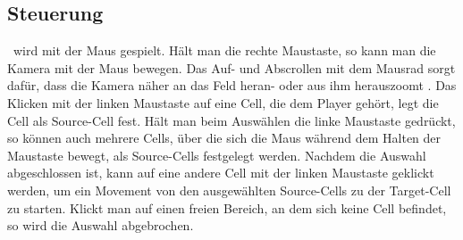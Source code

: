 \subsection{Steuerung}
\vires\ wird mit der Maus gespielt. Hält man die rechte Maustaste, so kann man die Kamera mit der Maus bewegen. Das Auf- und Abscrollen mit dem Mausrad sorgt dafür, dass die Kamera näher an das Feld heran- oder aus ihm herauszoomt . Das Klicken mit der linken Maustaste auf eine Cell, die dem Player gehört, legt die Cell als Source-Cell fest. Hält man beim Auswählen die linke Maustaste gedrückt, so können auch mehrere Cells, über die sich die Maus während dem Halten der Maustaste bewegt, als Source-Cells festgelegt werden. Nachdem die Auswahl abgeschlossen ist, kann auf eine andere Cell mit der linken Maustaste geklickt werden, um ein Movement von den ausgewählten Source-Cells zu der Target-Cell zu starten. Klickt man auf einen freien Bereich, an dem sich keine Cell befindet, so wird die Auswahl abgebrochen.
